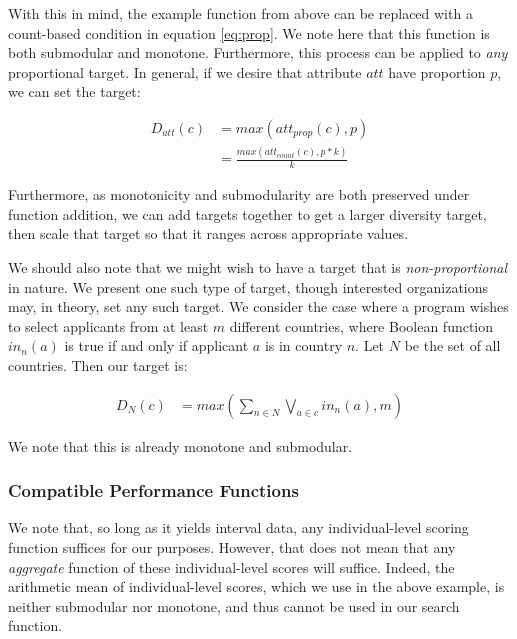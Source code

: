 With this in mind, the example function from above can be replaced with a count-based condition in equation \ref{eq:prop}. We note here that this function is both submodular and monotone. Furthermore, this process can be applied to \textit{any} proportional target. In general, if we desire that attribute $att$ have proportion $p$, we can set the target:

\begin{equation}
    \begin{split}
        D_{att}(c) &= max(att_{prop}(c), p) \\
        &= \frac{max(att_{count}(c), p*k)}{k}
    \end{split}
\end{equation}

Furthermore, as monotonicity and submodularity are both preserved under function addition, we can add targets together to get a larger diversity target, then scale that target so that it ranges across appropriate values.

We should also note that we might wish to have a target that is \textit{non-proportional} in nature. We present one such type of target, though interested organizations may, in theory, set any such target. We consider the case where a program wishes to select applicants from at least $m$ different countries, where Boolean function $in_n(a)$ is true if and only if applicant $a$ is in country $n$. Let $N$ be the set of all countries. Then our target is:

\begin{equation}
    \begin{split}
        D_N(c) &= max(\sum_{n \in N} \bigvee_{a \in c} in_n(a), m)
    \end{split}
\end{equation}

We note that this is already monotone and submodular.

\subsubsection{Compatible Performance Functions}
We note that, so long as it yields interval data, any individual-level scoring function suffices for our purposes. However, that does not mean that any \textit{aggregate} function of these individual-level scores will suffice. Indeed, the arithmetic mean of individual-level scores, which we use in the above example, is neither submodular nor monotone, and thus cannot be used in our search function.

